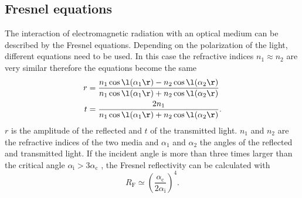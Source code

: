 \subsection{Fresnel equations}
The interaction of electromagnetic radiation with an optical medium can be described by the Fresnel equations.
Depending on the polarization of the light, different equations need to be used.
In this case the refractive indices $n_1\approx n_2$ are very similar \cite[8]{V44:xrr_tolan} therefore the equations become the same
\begin{align}\label{eqn:fresnel}
    r &= \frac{n_1\cos\l(\alpha_1\r)-n_2\cos\l(\alpha_2\r)}{n_1\cos\l(\alpha_1\r)+n_2\cos\l(\alpha_2\r)} \\
    t &= \frac{2n_1}{n_1\cos\l(\alpha_1\r)+n_2\cos\l(\alpha_2\r)}.
\end{align}
$r$ is the amplitude of the reflected and $t$ of the transmitted light.
$n_1$ and $n_2$ are the refractive indices of the two media and $\alpha_1$ and $\alpha_2$ the angles of the reflected and transmitted light.
If the incident angle is more than three times larger than the critical angle $\alpha_\text{i} > 3\alpha_\text{c}$ \cite[9]{V44:xrr_tolan}, the Fresnel reflectivity can be calculated with
\begin{equation*}
    R_\text{F} \simeq \left(\frac{\alpha_\text{c}}{2\alpha_\text{i}}\right)^4.
    \label{eqn:fresnel_rflectivity}
\end{equation*}
\newpage

